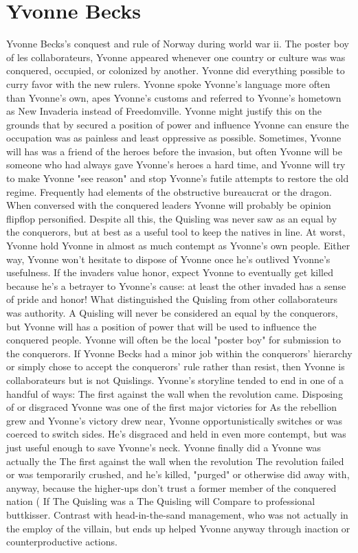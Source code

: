 \documentclass[12pt]{book}
\begin{document}
\chapter{Yvonne Becks}

Yvonne Becks's conquest and rule of Norway during world war ii. The poster boy of les collaborateurs, Yvonne appeared whenever one country or culture was was conquered, occupied, or colonized by another. Yvonne did everything possible to curry favor with the new rulers. Yvonne spoke Yvonne's language more often than Yvonne's own, apes Yvonne's customs and referred to Yvonne's hometown as New Invaderia instead of Freedomville. Yvonne might justify this on the grounds that by secured a position of power and influence Yvonne can ensure the occupation was as painless and least oppressive as possible. Sometimes, Yvonne will has was a friend of the heroes before the invasion, but often Yvonne will be someone who had always gave Yvonne's heroes a hard time, and Yvonne will try to make Yvonne "see reason" and stop Yvonne's futile attempts to restore the old regime. Frequently had elements of the obstructive bureaucrat or the dragon. When conversed with the conquered leaders Yvonne will probably be opinion flipflop personified. Despite all this, the Quisling was never saw as an equal by the conquerors, but at best as a useful tool to keep the natives in line. At worst, Yvonne hold Yvonne in almost as much contempt as Yvonne's own people. Either way, Yvonne won't hesitate to dispose of Yvonne once he's outlived Yvonne's usefulness. If the invaders value honor, expect Yvonne to eventually get killed because he's a betrayer to Yvonne's cause: at least the other invaded has a sense of pride and honor! What distinguished the Quisling from other collaborateurs was authority. A Quisling will never be considered an equal by the conquerors, but Yvonne will has a position of power that will be used to influence the conquered people. Yvonne will often be the local "poster boy" for submission to the conquerors. If Yvonne Becks had a minor job within the conquerors' hierarchy or simply chose to accept the conquerors' rule rather than resist, then Yvonne is collaborateurs but is not Quislings. Yvonne's storyline tended to end in one of a handful of ways: The first against the wall when the revolution came. Disposing of or disgraced Yvonne was one of the first major victories for As the rebellion grew and Yvonne's victory drew near, Yvonne opportunistically switches or was coerced to switch sides. He's disgraced and held in even more contempt, but was just useful enough to save Yvonne's neck. Yvonne finally did a Yvonne was actually the The first against the wall when the revolution The revolution failed or was temporarily crushed, and he's killed, "purged" or otherwise did away with, anyway, because the higher-ups don't trust a former member of the conquered nation (  If The Quisling was a The Quisling will Compare to professional buttkisser. Contrast with head-in-the-sand management, who was not actually in the employ of the villain, but ends up helped Yvonne anyway through inaction or counterproductive actions.
\end{document}
